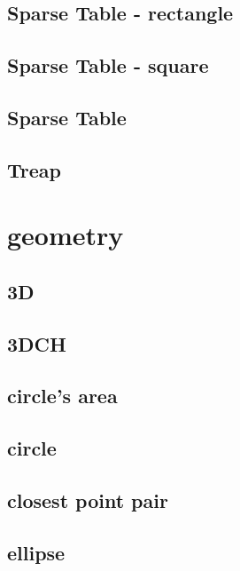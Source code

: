 \documentclass[a4paper,5pt,twocolumn,titlepage]{article}
\begin{document}
\subsection{Sparse Table - rectangle}

\subsection{Sparse Table - square}

\subsection{Sparse Table}

\subsection{Treap}


\section{geometry}
\subsection{3D}

\subsection{3DCH}

\subsection{circle's area}

\subsection{circle}

\subsection{closest point pair}

\subsection{ellipse}

\end{document}
